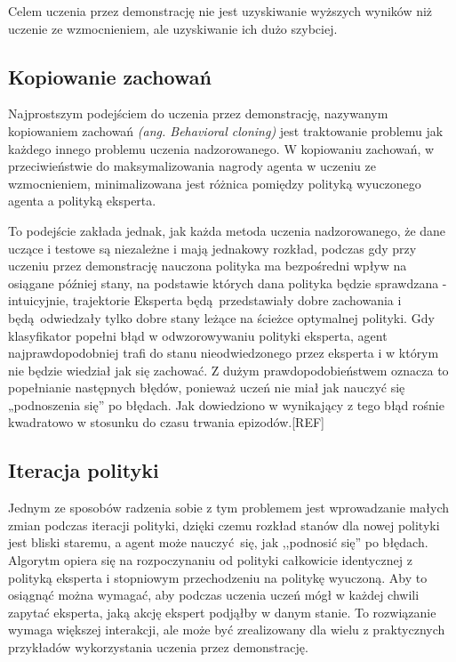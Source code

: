 Celem uczenia przez demonstrację nie jest uzyskiwanie wyższych wyników niż uczenie ze wzmocnieniem, ale uzyskiwanie ich dużo szybciej.

\subsection{Kopiowanie zachowań}

Najprostszym podejściem do uczenia przez demonstrację, nazywanym kopiowaniem zachowań \textit{(ang. Behavioral cloning)} jest traktowanie problemu jak każdego innego problemu uczenia nadzorowanego. W kopiowaniu zachowań, w przeciwieństwie do maksymalizowania nagrody agenta w uczeniu ze wzmocnieniem, minimalizowana jest różnica pomiędzy polityką wyuczonego agenta a polityką eksperta.

To podejście zakłada jednak, jak każda metoda uczenia nadzorowanego, że dane uczące i testowe są niezależne i mają jednakowy rozkład, podczas gdy przy uczeniu przez demonstrację nauczona polityka ma bezpośredni wpływ na osiągane później stany, na podstawie których dana polityka będzie sprawdzana - intuicyjnie, trajektorie Eksperta będą przedstawiały dobre zachowania i będą odwiedzały tylko dobre stany leżące na ścieżce optymalnej polityki. Gdy klasyfikator popełni błąd w odwzorowywaniu polityki eksperta, agent najprawdopodobniej trafi do stanu nieodwiedzonego przez eksperta i w którym nie będzie wiedział jak się zachować. Z dużym prawdopodobieństwem oznacza to popełnianie następnych błędów, ponieważ uczeń nie miał jak nauczyć się „podnoszenia się” po błędach. Jak dowiedziono w \cite{DBLP:journals/corr/abs-1011-0686} wynikający z tego błąd rośnie kwadratowo w stosunku do czasu trwania epizodów.[REF]

\subsection{Iteracja polityki}
Jednym ze sposobów radzenia sobie z tym problemem jest wprowadzanie małych zmian podczas iteracji polityki, dzięki czemu rozkład stanów dla nowej polityki jest bliski staremu, a agent może nauczyć się, jak ,,podnosić się'' po błędach. Algorytm opiera się na rozpoczynaniu od polityki całkowicie identycznej z polityką eksperta i stopniowym przechodzeniu na politykę wyuczoną. Aby to osiągnąć można wymagać, aby podczas uczenia uczeń mógł w każdej chwili zapytać eksperta, jaką akcję ekspert podjąłby w danym stanie. To rozwiązanie wymaga większej interakcji, ale może być zrealizowany dla wielu z praktycznych przykładów wykorzystania uczenia przez demonstrację.

